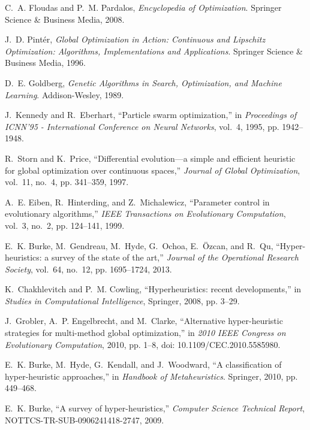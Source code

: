 \documentclass[conference]{IEEEtran}
\begin{document}
\begin{thebibliography}{99}

C.~A. Floudas and P.~M. Pardalos, \emph{Encyclopedia of Optimization}. Springer Science \& Business Media, 2008.

J.~D. Pint\'{e}r, \emph{Global Optimization in Action: Continuous and Lipschitz Optimization: Algorithms, Implementations and Applications}. Springer Science \& Business Media, 1996.

D.~E. Goldberg, \emph{Genetic Algorithms in Search, Optimization, and Machine Learning}. Addison-Wesley, 1989.

J.~Kennedy and R.~Eberhart, ``Particle swarm optimization,'' in \emph{Proceedings of ICNN'95 - International Conference on Neural Networks}, vol.~4, 1995, pp. 1942--1948.

R.~Storn and K.~Price, ``Differential evolution—a simple and efficient heuristic for global optimization over continuous spaces,'' \emph{Journal of Global Optimization}, vol.~11, no.~4, pp. 341--359, 1997.

A.~E. Eiben, R.~Hinterding, and Z.~Michalewicz, ``Parameter control in evolutionary algorithms,'' \emph{IEEE Transactions on Evolutionary Computation}, vol.~3, no.~2, pp. 124--141, 1999.

E.~K. Burke, M.~Gendreau, M.~Hyde, G.~Ochoa, E.~Özcan, and R.~Qu, ``Hyper-heuristics: a survey of the state of the art,'' \emph{Journal of the Operational Research Society}, vol.~64, no.~12, pp. 1695--1724, 2013.

K.~Chakhlevitch and P.~M. Cowling, ``Hyperheuristics: recent developments,'' in \emph{Studies in Computational Intelligence}, Springer, 2008, pp. 3--29.

J.~Grobler, A.~P. Engelbrecht, and M.~Clarke, ``Alternative hyper-heuristic strategies for multi-method global optimization,'' in \emph{2010 IEEE Congress on Evolutionary Computation}, 2010, pp. 1--8, doi: 10.1109/CEC.2010.5585980.

E.~K. Burke, M.~Hyde, G.~Kendall, and J.~Woodward, ``A classification of hyper-heuristic approaches,'' in \emph{Handbook of Metaheuristics}. Springer, 2010, pp. 449--468.

E.~K. Burke, ``A survey of hyper-heuristics,'' \emph{Computer Science Technical Report}, NOTTCS-TR-SUB-0906241418-2747, 2009.


\end{thebibliography}
\end{document}
